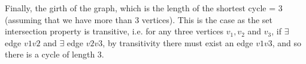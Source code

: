 \begin{enumerate}[a)]
\linebreak 
Finally, the girth of the graph, which is the length of the shortest cycle = 3 (assuming that we have more than 3 vertices). This is the case as the set intersection property is transitive, i.e. for any three vertices $v_1, v_2$ and $v_3$, if $\exists$ edge $v1v2$ and $\exists$ edge $v2v3$, by transitivity there must exist an edge $v1v3$, and so there is a cycle of length 3.
\end{enumerate}
